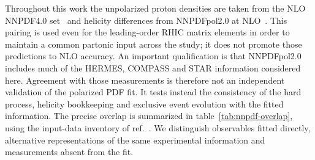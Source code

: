 \documentclass[11pt,a4paper]{article}
\begin{document}
Throughout this work the unpolarized proton densities are taken from the NLO
NNPDF4.0 set~\cite{NNPDF:2021} and helicity differences from NNPDFpol2.0 at
NLO~\cite{NNPDFpol:2025}.  This pairing is used even for the leading-order RHIC
matrix elements in order to maintain a common partonic input across the
study; it does not promote those predictions to NLO accuracy.  An important
qualification is that NNPDFpol2.0 includes much of the HERMES, COMPASS and
STAR information considered here.  Agreement with those measurements is
therefore not an independent validation of the polarized PDF fit.  It tests
instead the consistency of the hard process, helicity bookkeeping and
exclusive event evolution with the fitted information.  The precise overlap
is summarized in table~\ref{tab:nnpdf-overlap}, using the input-data inventory
of ref.~\cite{NNPDFpol:2025}.  We distinguish observables fitted directly,
alternative representations of the same experimental information and
measurements absent from the fit.
\end{document}
